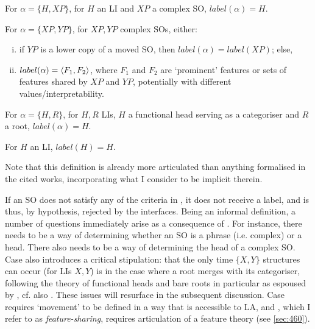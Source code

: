 \begin{subexamples}[
    preamble={\textit{The Labelling Algorithm of \textcite{ChomskyN_2013,ChomskyN_2015}}}
]\label{ex:popLA}
    \item\label{ex:popLA:a}
        For $\alpha = \{H, XP\}$, for $H$ an LI and $XP$ a complex SO, $label(\alpha) = H$.
    \item\label{ex:popLA:b}
        For $\alpha = \{XP, YP\}$, for $XP, YP$ complex SOs, either:
        \begin{enumerate}[(i)]
            \item\label{ex:popLA:bi} if $YP$ is a lower copy of a moved SO, then $label(\alpha) = label(XP)$; else,
            \item\label{ex:popLA:bii} $label(\alpha) = \langle F_1,F_2 \rangle$, where $F_1$ and $F_2$ are `prominent' features or sets of features shared by $XP$ and $YP$, potentially with different values/interpretability.
        \end{enumerate}
    \item\label{ex:popLA:c}
        For $\alpha = \{H, R\}$, for $H, R$ LIs, $H$ a functional head serving as a categoriser and $R$ a root, $label(\alpha) = H$.
    \item\label{ex:popLA:LI}
        For $H$ an LI, $label(H)=H$.
\end{subexamples}
\noindent
Note that this definition is already more articulated than anything formalised in the cited works, incorporating what I consider to be implicit therein.

If an SO does not satisfy any of the criteria in , it does not receive a label, and is thus, by hypothesis, rejected by the interfaces. Being an informal definition, a number of questions immediately arise as a consequence of . For instance, there needs to be a way of determining whether an SO is a phrase (i.e. complex) or a head. There also needs to be a way of determining the head of a complex SO. Case  also introduces a critical stipulation: that the only time $\{X,Y\}$ structures can occur (for LIs $X, Y$) is in the case where a root merges with its categoriser, following the theory of functional heads and bare roots in particular as espoused by \textcite{MarantzA_2013}, cf. also \textcite{BorerH_2005,BorerH_2005a,BorerH_2013}. These issues will resurface in the subsequent discussion. Case  requires `movement' to be defined in a way that is accessible to LA, and , which I refer to as \textit{feature-sharing}, requires articulation of a feature theory (see \autoref{sec:460}).

